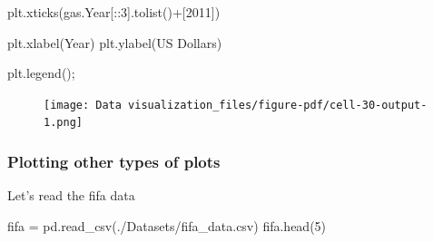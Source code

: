 \documentclass[
  letterpaper,
  DIV=11,
  numbers=noendperiod]{scrreprt}
\newenvironment{Shaded}{\begin{snugshade}}{\end{snugshade}}
\newcommand{\DecValTok}[1]{\textcolor[rgb]{0.68,0.00,0.00}{#1}}
\newcommand{\NormalTok}[1]{\textcolor[rgb]{0.00,0.23,0.31}{#1}}
\newcommand{\OperatorTok}[1]{\textcolor[rgb]{0.37,0.37,0.37}{#1}}
\newcommand{\StringTok}[1]{\textcolor[rgb]{0.13,0.47,0.30}{#1}}
\begin{document}
\begin{Shaded}
\begin{Highlighting}[]
\NormalTok{plt.xticks(gas.Year[::}\DecValTok{3}\NormalTok{].tolist()}\OperatorTok{+}\NormalTok{[}\DecValTok{2011}\NormalTok{])}

\NormalTok{plt.xlabel(}\StringTok{\textquotesingle{}Year\textquotesingle{}}\NormalTok{)}
\NormalTok{plt.ylabel(}\StringTok{\textquotesingle{}US Dollars\textquotesingle{}}\NormalTok{)}

\NormalTok{plt.legend()}\OperatorTok{;}
\end{Highlighting}
\end{Shaded}

\begin{figure}[H]

{\centering \texttt{[image: Data visualization\_files/figure-pdf/cell-30-output-1.png]}

}

\end{figure}

\hypertarget{plotting-other-types-of-plots}{%
\subsubsection{Plotting other types of
plots}\label{plotting-other-types-of-plots}}

Let's read the fifa data

\begin{Shaded}
\begin{Highlighting}[]
\NormalTok{fifa }\OperatorTok{=}\NormalTok{ pd.read\_csv(}\StringTok{\textquotesingle{}./Datasets/fifa\_data.csv\textquotesingle{}}\NormalTok{)}
\NormalTok{fifa.head(}\DecValTok{5}\NormalTok{)}
\end{Highlighting}
\end{Shaded}
\end{document}
